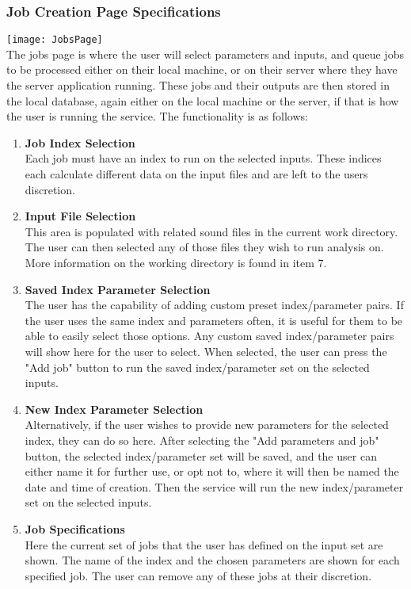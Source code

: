 \subsubsection{Job Creation Page Specifications}
\texttt{[image: JobsPage]}\\
The jobs page is where the user will select parameters and inputs, and queue jobs to be processed either on their local machine, or on their server where they have the server application running. These jobs and their outputs are then stored in the local database, again either on the local machine or the server, if that is how the user is running the service. The functionality is as follows:\\
\begin{enumerate}
    \item \textbf{Job Index Selection}\\ Each job must have an index to run on the selected inputs. These indices each calculate different data on the input files and are left to the user\textquotesingle s discretion.
    \item \textbf{Input File Selection}\\ This area is populated with related sound files in the current work directory. The user can then selected any of those files they wish to run analysis on. More information on the working directory is found in item 7.
    \item \textbf{Saved Index Parameter Selection}\\ The user has the capability of adding custom preset index/parameter pairs. If the user uses the same index and parameters often, it is useful for them to be able to easily select those options. Any custom saved index/parameter pairs will show here for the user to select. When selected, the user can press the "Add job" button to run the saved index/parameter set on the selected inputs.
    \item \textbf{New Index Parameter Selection}\\ Alternatively, if the user wishes to provide new parameters for the selected index, they can do so here. After selecting the "Add parameters and job" button, the selected index/parameter set will be saved, and the user can either name it for further use, or opt not to, where it will then be named the date and time of creation. Then the service will run the new index/parameter set on the selected inputs.
    \item \textbf{Job Specifications}\\ Here the current set of jobs that the user has defined on the input set are shown. The name of the index and the chosen parameters are shown for each specified job. The user can remove any of these jobs at their discretion.

\end{enumerate}
